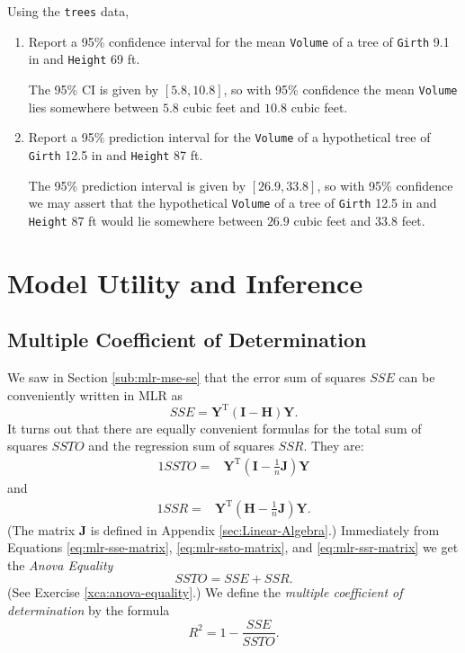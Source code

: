 \documentclass[captions=tableheading]{scrbook}
\begin{document}
\begin{example}
Using the \texttt{trees} data, 

\begin{enumerate}
\item Report a 95\% confidence interval for the mean \texttt{Volume} of a tree of \texttt{Girth} 9.1 in and \texttt{Height} 69 ft.

   The 95\% CI is given by \( [  5.8,  10.8 ] \), so with 95\% confidence the mean \texttt{Volume} lies somewhere between \(  5.8 \) cubic feet and \(  10.8 \) cubic feet.
\item Report a 95\% prediction interval for the \texttt{Volume} of a hypothetical tree of \texttt{Girth} 12.5 in and \texttt{Height} 87 ft.

   The 95\% prediction interval is given by \( [  26.9,  33.8 ] \), so with 95\% confidence we may assert that the hypothetical \texttt{Volume} of a tree of \texttt{Girth} 12.5 in and \texttt{Height} 87 ft would lie somewhere between \(  26.9 \) cubic feet and \(  33.8 \) feet.
\end{enumerate}

\end{example}
\section{Model Utility and Inference}
\label{sec-7-3}

\label{sec:Model-Utility-and-MLR}
\subsection{Multiple Coefficient of Determination}
\label{sec-7-3-1}


We saw in Section \ref{sub:mlr-mse-se} that the error sum of squares \(SSE\) can be conveniently written in MLR as 
\begin{equation}
SSE=\mathbf{Y}^{\mathrm{T}}(\mathbf{I}-\mathbf{H})\mathbf{Y}.\label{eq:mlr-sse-matrix}
\end{equation}
It turns out that there are equally convenient formulas for the total sum of squares \(SSTO\) and the regression sum of squares \(SSR\). They are:
\begin{alignat}{1}
SSTO= & \mathbf{Y}^{\mathrm{T}}\left(\mathbf{I}-\frac{1}{n}\mathbf{J}\right)\mathbf{Y}\label{eq:mlr-ssto-matrix}
\end{alignat}
and
\begin{alignat}{1}
SSR= & \mathbf{Y}^{\mathrm{T}}\left(\mathbf{H}-\frac{1}{n}\mathbf{J}\right)\mathbf{Y}.\label{eq:mlr-ssr-matrix}
\end{alignat}
(The matrix \(\mathbf{J}\) is defined in Appendix \ref{sec:Linear-Algebra}.) Immediately from Equations \ref{eq:mlr-sse-matrix}, \ref{eq:mlr-ssto-matrix}, and \ref{eq:mlr-ssr-matrix} we get the \emph{Anova Equality}
\begin{equation} 
SSTO=SSE+SSR.
\end{equation}
(See Exercise \ref{xca:anova-equality}.) We define the \emph{multiple coefficient of determination} by the formula
\begin{equation} 
R^{2}=1-\frac{SSE}{SSTO}.
\end{equation}
\end{document}
